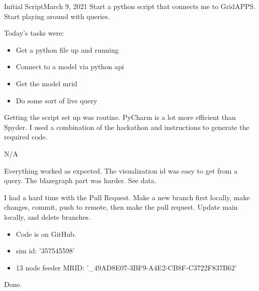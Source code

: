 
\begin{entry}{Initial Script}{March 9, 2021}
    \objective
    Start a python script that connects me to GridAPPS. Start playing around with queries.

    \outline

    Today's tasks were:
        \begin{itemize}
            \item Get a python file up and running
            \item Connect to a model via python api
            \item Get the model mrid
            \item Do some sort of live query
        \end{itemize}

    \procedures

        Getting the script set up was routine. PyCharm is a lot more efficient than Spyder.
        I used a combination of the hackathon and instructions to generate the required code.

    \parameters

    N/A

    \observations

        Everything worked as expected. The visualization id was easy to get from a query. The
        blazegraph part was harder. See data.

        I had a hard time with the Pull Request. Make a new branch first locally, make changes, commit, push to remote,
        then make the pull request. Update main locally, and delete branches.

    \data
    \begin{itemize}
        \item Code is on GitHub.
        \item sim id: '357545598'
        \item 13 node feeder MRID: '\_49AD8E07-3BF9-A4E2-CB8F-C3722F837B62'
    \end{itemize}




    \results

    Done.

\end{entry}